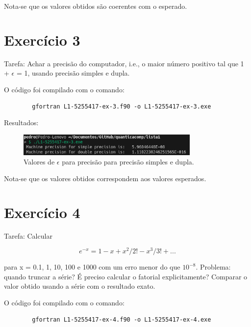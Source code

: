 \documentclass[12pt, a4paper]{article} %
\begin{document}
    Nota-se que os valores obtidos s\~ao coerentes com o esperado.

\section{Exerc\'icio 3}

    Tarefa: Achar a precis\~ao  do computador, i.e., o maior n\'umero positivo  tal que
    1 + $\epsilon$ = 1, usando precis\~ao simples e dupla.


    O c\'odigo foi compilado com o comando:
    \begin{verbatim}
        gfortran L1-5255417-ex-3.f90 -o L1-5255417-ex-3.exe
    \end{verbatim}

    Resultados:
    \begin{figure}[H]
        \centering
        \includegraphics[width=0.8\textwidth]{../images/results-ex3.png}
        \caption{Valores de $\epsilon$ para precis\~ao para precis\~ao simples e dupla.}
    \end{figure}

    Nota-se que os valores obtidos correspondem aos valores esperados.

\section{Exerc\'icio 4}

    Tarefa: Calcular

    \begin{equation} e^{-x} = 1 - x + x^2/2! - x^3/3! + ... \end{equation}

    para x = 0.1, 1, 10, 100 e 1000 com um erro menor do que $10^{-8}$. Problema: quando truncar a s\'erie? \'E preciso calcular o fatorial explicitamente? Comparar o valor obtido usando a s\'erie com o resultado exato.


    O c\'odigo foi compilado com o comando:
    \begin{verbatim}
        gfortran L1-5255417-ex-4.f90 -o L1-5255417-ex-4.exe
    \end{verbatim}
\end{document}
